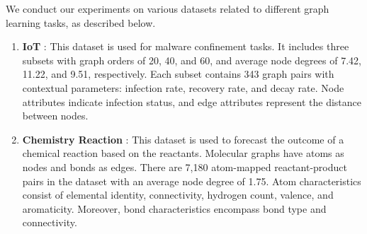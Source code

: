 \label{dataset} We conduct our experiments on various datasets related to different graph learning tasks, as described below.


\begin{enumerate}
\item \label{data:iot}\textbf{IoT} \cite{guo2019deep}: This dataset is used for malware confinement tasks. It includes three subsets with graph orders of 20, 40, and 60, and average node degrees of 7.42, 11.22, and 9.51, respectively. Each subset contains 343 graph pairs with contextual parameters: infection rate, recovery rate, and decay rate. Node attributes indicate infection status, and edge attributes represent the distance between nodes.

\item \label{data:chem}\textbf{Chemistry Reaction} \cite{guo2019deep, lowe2014patent}: This dataset is used to forecast the outcome of a chemical reaction based on the reactants. Molecular graphs have atoms as nodes and bonds as edges. There are 7,180 atom-mapped reactant-product pairs in the dataset with an average node degree of 1.75. Atom characteristics consist of elemental identity, connectivity, hydrogen count, valence, and aromaticity. Moreover, bond characteristics encompass bond type and connectivity.





\end{enumerate}

